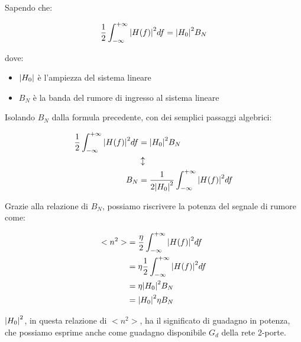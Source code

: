 Sapendo che: 

{
    \Large 
    \begin{equation}
        \frac{1}{2} \int_{-\infty}^{+\infty} \abs{H(f)}^{2} df = \abs{H_0}^{2} B_N
    \end{equation}
}

dove: 

\begin{itemize}
    \item $\abs{H_0}$ è l'ampiezza del sistema lineare 
    \item $B_N$ è la banda del rumore di ingresso al sistema lineare
\end{itemize}

Isolando $B_N$ dalla formula precedente, con dei semplici passaggi algebrici: 

{
    \Large 
    \begin{equation}
        \begin{split}
            \frac{1}{2} \int_{-\infty}^{+\infty} \abs{H(f)}^{2} df 
            &= 
            \abs{H_0}^{2} B_N
            \\
            &\updownarrow
            \\
            B_N 
            &= 
            \frac{1}{2 \abs{H_0}^{2} } \int_{-\infty}^{+\infty} \abs{H(f)}^{2} df
        \end{split}
    \end{equation}
}

Grazie alla relazione di $B_N$, possiamo riscrivere la potenza del segnale di rumore come: 

{
    \Large 
    \begin{equation}
        \begin{split}
        <n^{2}>
        &=
            \frac{\eta}{2}
             \int_{-\infty}^{+\infty}
            \abs{H(f)}^{2} 
            df 
        \\
        &= 
        \eta \frac{1}{2}
           \int_{-\infty}^{+\infty}
            \abs{H(f)}^{2} 
            df 
        \\
        &= 
        \eta \abs{H_0}^{2} B_N
        \\
        &= 
        \abs{H_0}^{2} \eta  B_N
        \end{split}
    \end{equation}
}

$\abs{H_0}^{2}$, in questa relazione di $<n^{2}>$, ha il significato di guadagno in potenza, 
che possiamo esprime anche come guadagno disponibile $G_d$ della rete 2-porte. \newline 

